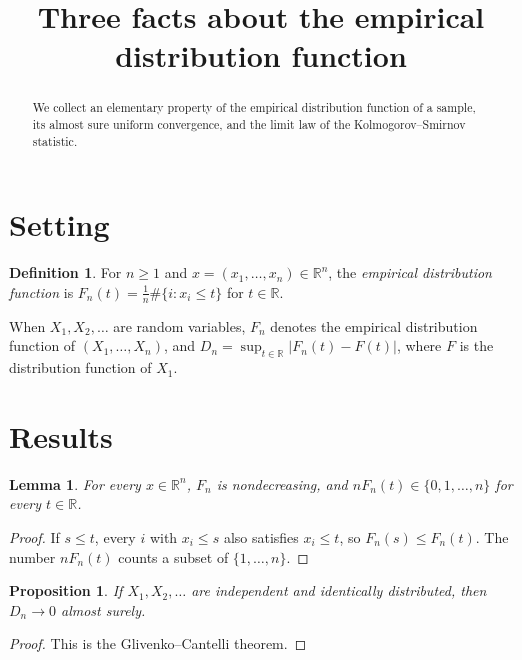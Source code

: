 \documentclass[11pt]{article}
\title{Three facts about the empirical distribution function}
\author{}
\date{}
\newtheorem{lemma}[theorem]{Lemma}
\newtheorem{proposition}[theorem]{Proposition}
\theoremstyle{definition}
\newtheorem{definition}[theorem]{Definition}
\begin{document}
\maketitle

\begin{abstract}
We collect an elementary property of the empirical distribution function of a sample, its almost sure uniform
convergence, and the limit law of the Kolmogorov--Smirnov statistic.
\end{abstract}

\section{Setting}

\begin{definition}\label{def:edf}
For $n \ge 1$ and $x = (x_1, \dots, x_n) \in \mathbb{R}^n$, the \emph{empirical distribution function} is
$F_n(t) = \frac1n \#\{ i : x_i \le t \}$ for $t \in \mathbb{R}$.
\end{definition}

When $X_1, X_2, \dots$ are random variables, $F_n$ denotes the empirical distribution function of
$(X_1, \dots, X_n)$, and $D_n = \sup_{t \in \mathbb{R}} \lvert F_n(t) - F(t) \rvert$, where $F$ is the distribution
function of $X_1$.

\section{Results}

\begin{lemma}\label{lem:steps}
For every $x \in \mathbb{R}^n$, $F_n$ is nondecreasing, and $n F_n(t) \in \{0, 1, \dots, n\}$ for every
$t \in \mathbb{R}$.
\end{lemma}

\begin{proof}
If $s \le t$, every $i$ with $x_i \le s$ also satisfies $x_i \le t$, so $F_n(s) \le F_n(t)$. The number
$n F_n(t)$ counts a subset of $\{1, \dots, n\}$.
\end{proof}

\begin{proposition}\label{prop:gc}
If $X_1, X_2, \dots$ are independent and identically distributed, then $D_n \to 0$ almost surely.
\end{proposition}

\begin{proof}
This is the Glivenko--Cantelli theorem.
\end{proof}
\end{document}
